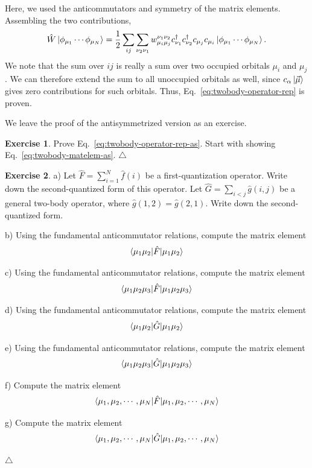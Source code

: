 \documentclass{report}
\theoremstyle{plain}
\theoremstyle{definition}
\newtheorem{exerc}{Exercise}[chapter]
\newcommand\xqed[1]{%
  \leavevmode\unskip\penalty9999 \hbox{}\nobreak\hfill
  \quad\hbox{#1}}
\newcommand\demo{\xqed{$\triangle$}}
\newenvironment{exercise}{\bigskip\begin{exerc}}{\demo\end{exerc}\bigskip}
\begin{document}
Here, we used the anticommutators and symmetry of the matrix elements.
Assembling the two contributions,
\begin{equation}
  \hat{W} \ket{\phi_{\mu_1}\cdots\phi_{\mu_N}} = \frac{1}{2} \sum_{ij} \sum_{\nu_2\nu_1}
    w^{\nu_1\nu_2}_{\mu_i\mu_j}  c^\dag_{\nu_1}c^\dag_{\nu_2}
    c_{\mu_j}c_{\mu_i}\ket{\phi_{\mu_1}\cdots\phi_{\mu_N}} .
\end{equation}
We note that the sum over $ij$ is really a sum over two occupied
orbitals $\mu_i$ and $\mu_j$. We can therefore extend the sum to all
unoccupied orbitals as well, since $c_{\alpha}\ket{\vec{\mu}}$ gives zero contributions
for such orbitals. Thus, Eq.~\eqref{eq:twobody-operator-rep} is
proven.

We leave the proof of the antisymmetrized version as an exercise.
\begin{exercise}
  Prove Eq.~\eqref{eq:twobody-operator-rep-as}. Start with showing
  Eq.~\eqref{eq:twobody-matelem-as}.
\end{exercise}



\begin{exercise}\label{exercise:diagonal-matrix-elements} %
  a) Let $\hat{F} = \sum_{i=1}^N \hat{f}(i)$ be a first-quantization
  operator. Write down the second-quantized form of this operator. Let
  $\hat{G} = \sum_{i<j} \hat{g}(i,j)$ be a general two-body operator,
  where $\hat{g}(1,2) = \hat{g}(2,1)$. Write down the second-quantized
  form.

  b) Using the fundamental anticommutator relations, compute the matrix element
  \[ \braket{\mu_1\mu_2|\hat{F}|\mu_1\mu_2} \]

  c) Using the fundamental anticommutator relations, compute the matrix element
  \[ \braket{\mu_1\mu_2\mu_3|\hat{F}|\mu_1\mu_2\mu_3} \]

  d) Using the fundamental anticommutator relations, compute the matrix element
  \[ \braket{\mu_1\mu_2|\hat{G}|\mu_1\mu_2} \]

  e) Using the fundamental anticommutator relations, compute the matrix element
  \[ \braket{\mu_1\mu_2\mu_3|\hat{G}|\mu_1\mu_2\mu_3} \]
  
  f) Compute the matrix element
  \[  \braket{\mu_1,\mu_2,\cdots,\mu_N|\hat{F}|\mu_1,\mu_2,\cdots,\mu_N} \]

  g) Compute the matrix element
  \[  \braket{\mu_1,\mu_2,\cdots,\mu_N|\hat{G}|\mu_1,\mu_2,\cdots,\mu_N} \]
  
\end{exercise}
\end{document}
